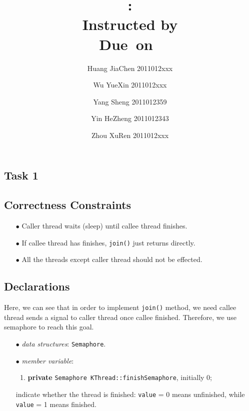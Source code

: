 \documentclass{article}
\title{\textmd{\bf \Class: \Title}\\{\large Instructed by \textit{\ClassInstructor}}\\\normalsize\vspace{0.1in}\small{Due\ on\ \DueDate}}
\date{}
\author{%
  Huang JiaChen 2011012xxx \and
  Wu YueXin 2011012xxx \and
  Yang Sheng 2011012359 \and
  Yin HeZheng 2011012343 \and
  Zhou XuRen 2011012xxx}
\begin{document}
  \begin{spacing}{1.1}
    \maketitle \thispagestyle{empty}


\theoremstyle{plain} \newtheorem{computational}{Definition}
    \section{Task 1}

    \subsection{Correctness Constraints}
    \begin{enumerate}
      \item[$\bullet$] Caller thread waits (sleep) until callee thread finishes.
      \item[$\bullet$] If callee thread has finishes, \texttt{join()} just returns
	directly.
      \item[$\bullet$] All the threads except caller thread should not be effected. 
    \end{enumerate}

    \subsection{Declarations}
    Here, we can see that in order to implement \texttt{join()} method, we need callee
    thread sends a signal to caller thread once callee finished. Therefore, we use
    semaphore to reach this goal. 
    \begin{enumerate}
      \item[$\bullet$] \textit{data structures}: \texttt{Semaphore}.
      \item[$\bullet$] \textit{member variable}:
	\begin{enumerate}
	  \item \textbf{private} \texttt{Semaphore KThread::finishSemaphore}, initially 0;
	\end{enumerate}
	indicate whether the thread is finished: \texttt{value} = 0 means unfinished, while
	\texttt{value} = 1 means finished.

    \end{enumerate}


\end{spacing}
\end{document}

